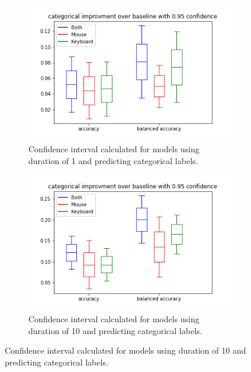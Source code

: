 \documentclass[../main.tex]{subfiles}
\begin{document}
    \begin{figure}
        \centering
        \begin{subfigure}[b]{0.42\textwidth}
            \centering
            \includegraphics[width=\textwidth]{figures/results/1_categorical_0.95.png}
            \captionsetup{justification=centering}
            \caption{Confidence interval calculated for models using duration of 1 and predicting categorical labels.}
            \label{fig:cat_1}
        \end{subfigure}
        \hfill
        \begin{subfigure}[b]{0.42\textwidth}
            \centering
            \includegraphics[width=\textwidth]{figures/results/10_categorical_0.95.png}
            \captionsetup{justification=centering}
            \caption{Confidence interval calculated for models using duration of 10 and predicting categorical labels.}
            \label{fig:cat_10}

\end{subfigure}
\end{figure}
\end{document}

